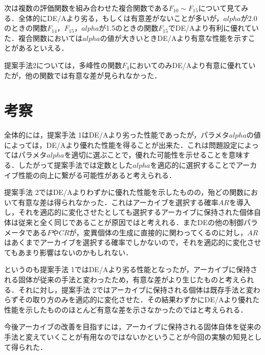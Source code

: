 \documentclass[a4paper,11pt,oneside,openany]{jsbook}
\begin{document}
次は複数の評価関数を組み合わせた複合関数である$F_{10}{\sim}F_{15}$について見てみる．全体的にDE/Aより劣る，もしくは有意差がないことが多いが，$alpha$が2.0のときの関数$F_{14}$，$F_{15}$，$alpha$が1.5のときの関数$F_{15}$でDE/Aより有利に優れていた．複合関数においては$alpha$の値が大きいときDE/Aより有意な性能を示すことがあるといえる．

提案手法2については，多峰性の関数$F_{4}$においてのみDE/Aより有意に優れていたが，他の関数では有意な差が見られなかった．

\section{考察}
全体的には，提案手法 1はDE/Aより劣った性能であったが，パラメタ$alpha$の値によっては，DE/Aより優れた性能を得ることが出来た．これは問題設定によってはパラメタ$alpha$を適切に選ぶことで，優れた可能性を示せることを意味する．したがって提案手法では定数とした$alpha$を適応的に選択することでアーカイブ性能の向上に繋がる可能性があると考えられる．

提案手法 2ではDE/Aよりわずかに優れた性能を示したものの，殆どの関数において有意な差は得られなかった．これはアーカイブを選択する確率$AR$を導入し，それを適応的に変化させたとしても選択するアーカイブに保持された個体自体は従来と全く同じであることが原因ではと考えれる．またDEの他の制御パラメータである$F$や$CR$が，変異個体の生成に直接的に関わってくるのに対し，$AR$はあくまでアーカイブを選択する確率でしかないので，それを適応的に変化させてもあまり影響はないのかもしれない．

というのも提案手法 1ではDE/Aより劣る性能となったが，アーカイブに保持される固体が従来の手法と変わったため，有意な差がより生じたものと考えられる．それに対し，提案手法 2ではアーカイブに保持される個体は既存手法と変わらずその取り方のみを適応的に変化させた．その結果わずかにDE/Aより優れた性能を示したもののほとんど有意な差を示さなかったのではと考えられる．

今後アーカイブの改善を目指すには，アーカイブに保持される固体自体を従来の手法と変えていくことが有用なのではないかということが今回の実験の知見として得られた．
\end{document}
